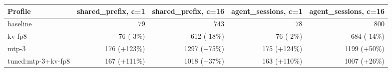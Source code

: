 \begin{tabular}{lrrrr}
\toprule
Profile & shared\_prefix, c=1 & shared\_prefix, c=16 & agent\_sessions, c=1 & agent\_sessions, c=16 \\
\midrule
baseline & 79 & 743 & 78 & 800 \\
kv-fp8 & 76 (-3\%) & 612 (-18\%) & 76 (-2\%) & 684 (-14\%) \\
mtp-3 & 176 (+123\%) & 1297 (+75\%) & 175 (+124\%) & 1199 (+50\%) \\
tuned:mtp-3+kv-fp8 & 167 (+111\%) & 1018 (+37\%) & 163 (+110\%) & 1007 (+26\%) \\
\bottomrule
\end{tabular}
